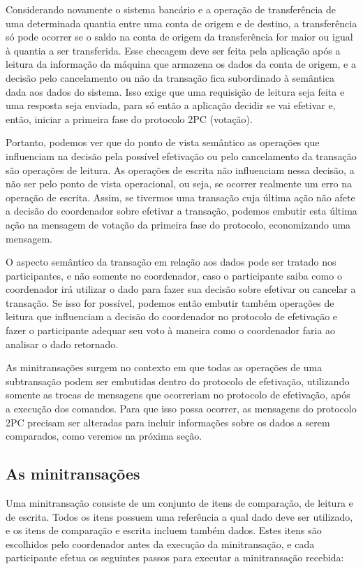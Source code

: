 \documentclass[11pt,twoside,a4paper]{book}
\begin{document}
Considerando novamente o sistema bancário e a operação de transferência de uma determinada quantia entre uma conta de origem e de destino, a transferência só pode ocorrer se o saldo na conta de origem da transferência for maior ou igual à quantia a ser transferida. Esse checagem deve ser feita pela aplicação após a leitura da informação da máquina que armazena os dados da conta de origem, e a decisão pelo cancelamento ou não da transação fica subordinado à semântica dada aos dados do sistema. Isso exige que uma requisição de leitura seja feita e uma resposta seja enviada, para só então a aplicação decidir se vai efetivar e, então, iniciar a primeira fase do protocolo 2PC (votação).

Portanto, podemos ver que do ponto de vista semântico as operações que influenciam na decisão pela possível efetivação ou pelo cancelamento da transação são operações de leitura. As operações de escrita não influenciam nessa decisão, a não ser pelo ponto de vista operacional, ou seja, se ocorrer realmente um erro na operação de escrita. Assim, se tivermos uma transação cuja última ação não afete a decisão do coordenador sobre efetivar a transação, podemos embutir esta última ação na mensagem de votação da primeira fase do protocolo, economizando uma mensagem.

O aspecto semântico da transação em relação aos dados pode ser tratado nos participantes, e não somente no coordenador, caso o participante saiba como o coordenador irá utilizar o dado para fazer sua decisão sobre efetivar ou cancelar a transação. Se isso for possível, podemos então embutir também operações de leitura que influenciam a decisão do coordenador no protocolo de efetivação e fazer o participante adequar seu voto à maneira como o coordenador faria ao analisar o dado retornado.

As minitransações surgem no contexto em que todas as operações de uma subtransação podem ser embutidas dentro do protocolo de efetivação, utilizando somente as trocas de mensagens que ocorreriam no protocolo de efetivação, após a execução dos comandos. Para que isso possa ocorrer, as mensagens do protocolo 2PC precisam ser alteradas para incluir informações sobre os dados a serem comparados, como veremos na próxima seção.

\subsection{As minitransações}
\label{subsec:estrutura-minitransacoes}
Uma minitransação consiste de um conjunto de itens de comparação, de leitura e de escrita. Todos os itens possuem uma referência a qual dado deve ser utilizado, e os itens de comparação e escrita incluem também dados. Estes itens são escolhidos pelo coordenador antes da execução da minitransação, e cada participante efetua os seguintes passos para executar a minitransação recebida:
\end{document}
